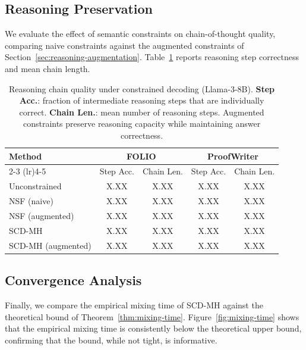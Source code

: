\documentclass[twoside,11pt]{article}
\begin{document}
\subsection{Reasoning Preservation}
\label{sec:exp-reasoning}

We evaluate the effect of semantic constraints on chain-of-thought quality,
comparing naive constraints against the augmented constraints of
Section~\ref{sec:reasoning-augmentation}. Table~\ref{tab:reasoning} reports
reasoning step correctness and mean chain length.

\begin{table}[t]
\caption{Reasoning chain quality under constrained decoding (Llama-3-8B).
\textbf{Step Acc.}: fraction of intermediate reasoning steps that are
individually correct. \textbf{Chain Len.}: mean number of reasoning steps.
Augmented constraints preserve reasoning capacity while maintaining answer
correctness.}
\label{tab:reasoning}
\centering
\begin{tabular}{lcccc}
\toprule
\textbf{Method} & \multicolumn{2}{c}{\textbf{FOLIO}} &
\multicolumn{2}{c}{\textbf{ProofWriter}} \\
\cmidrule(lr){2-3} \cmidrule(lr){4-5}
 & Step Acc. & Chain Len. & Step Acc. & Chain Len. \\
\midrule
Unconstrained   & X.XX & X.XX & X.XX & X.XX \\
NSF (naive)     & X.XX & X.XX & X.XX & X.XX \\
NSF (augmented) & X.XX & X.XX & X.XX & X.XX \\
SCD-MH          & X.XX & X.XX & X.XX & X.XX \\
SCD-MH (augmented) & X.XX & X.XX & X.XX & X.XX \\
\bottomrule
\end{tabular}
\end{table}

\subsection{Convergence Analysis}
\label{sec:exp-convergence}

Finally, we compare the empirical mixing time of SCD-MH against the
theoretical bound of Theorem~\ref{thm:mixing-time}.
Figure~\ref{fig:mixing-time} shows that the empirical mixing time is
consistently below the theoretical upper bound, confirming that the bound,
while not tight, is informative.
\end{document}
